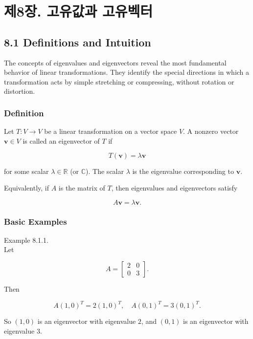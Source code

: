 \documentclass[
  12pt,
  a4paper,
]{article}
\let\oldsection\section
\renewcommand{\section}{\clearpage\oldsection}
\begin{document}
\section{제8장. 고유값과
고유벡터}\label{chapter-8-eigenvalues-and-eigenvectors}

\subsection{8.1 Definitions and
Intuition}\label{81-definitions-and-intuition}

The concepts of eigenvalues and eigenvectors reveal the most fundamental
behavior of linear transformations. They identify the special directions
in which a transformation acts by simple stretching or compressing,
without rotation or distortion.

\subsubsection{Definition}\label{definition-5}

Let \(T: V \to V\) be a linear transformation on a vector space \(V\). A
nonzero vector \(\mathbf{v} \in V\) is called an eigenvector of \(T\) if

\[T(\mathbf{v}) = \lambda \mathbf{v}\]

for some scalar \(\lambda \in \mathbb{R}\) (or \(\mathbb{C}\)). The
scalar \(\lambda\) is the eigenvalue corresponding to \(\mathbf{v}\).

Equivalently, if \(A\) is the matrix of \(T\), then eigenvalues and
eigenvectors satisfy

\[A\mathbf{v} = \lambda \mathbf{v}.\]

\subsubsection{Basic Examples}\label{basic-examples}

Example 8.1.1.\\
Let

\[A = \begin{bmatrix} 2 & 0 \\ 0 & 3 \end{bmatrix}.\]

Then

\[A(1,0)^T = 2(1,0)^T, \quad A(0,1)^T = 3(0,1)^T.\]

So \((1,0)\) is an eigenvector with eigenvalue \(2\), and \((0,1)\) is
an eigenvector with eigenvalue \(3\).
\end{document}
